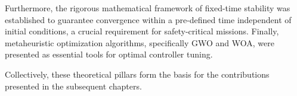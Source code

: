 Furthermore, the rigorous mathematical framework of fixed-time stability was established to guarantee convergence within a pre-defined time independent of initial conditions, a crucial requirement for safety-critical missions. Finally, metaheuristic optimization algorithms, specifically GWO and WOA, were presented as essential tools for optimal controller tuning.

Collectively, these theoretical pillars form the basis for the contributions presented in the subsequent chapters. 